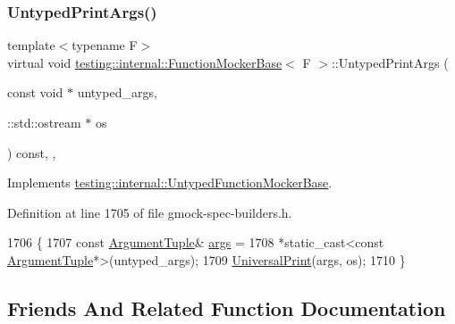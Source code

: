 \subsubsection{\texorpdfstring{Untyped\+Print\+Args()}{UntypedPrintArgs()}}
{\footnotesize\ttfamily template$<$typename F$>$ \\
virtual void \hyperlink{classtesting_1_1internal_1_1FunctionMockerBase}{testing\+::internal\+::\+Function\+Mocker\+Base}$<$ F $>$\+::Untyped\+Print\+Args (\begin{DoxyParamCaption}\item[{const void $\ast$}]{untyped\+\_\+args,  }\item[{\+::std\+::ostream $\ast$}]{os }\end{DoxyParamCaption}) const\hspace{0.3cm}{\ttfamily [inline]}, {\ttfamily [private]}, {\ttfamily [virtual]}}



Implements \hyperlink{classtesting_1_1internal_1_1UntypedFunctionMockerBase_ae8c91f05fc90e66a84df49aae8de0d41}{testing\+::internal\+::\+Untyped\+Function\+Mocker\+Base}.



Definition at line 1705 of file gmock-\/spec-\/builders.\+h.


\begin{DoxyCode}
1706                                                       \{
1707     \textcolor{keyword}{const} \hyperlink{classtesting_1_1internal_1_1FunctionMockerBase_a336432a07e544af4ffb8103603471ca3}{ArgumentTuple}& \hyperlink{namespacegenerate__debs_a75f9143e38df82d83b2e8a6f99cae02c}{args} =
1708         *\textcolor{keyword}{static\_cast<}\textcolor{keyword}{const }\hyperlink{classtesting_1_1internal_1_1FunctionMockerBase_a336432a07e544af4ffb8103603471ca3}{ArgumentTuple}*\textcolor{keyword}{>}(untyped\_args);
1709     \hyperlink{namespacetesting_1_1internal_a30708fa2bacf11895b03bdb21eb72309}{UniversalPrint}(args, os);
1710   \}
\end{DoxyCode}


\subsection{Friends And Related Function Documentation}
\mbox{\label{classtesting_1_1internal_1_1FunctionMockerBase_ae72aeee91c93e8ae5e1ed7f726a766b2}} 

